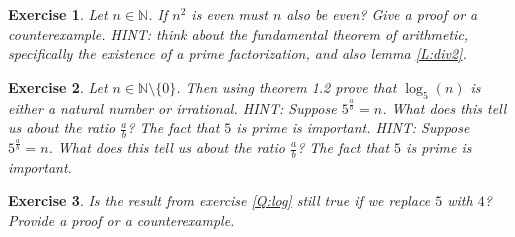 \documentclass{article}
\theoremstyle{plain}
\newtheorem{Q}{Exercise}{\bfseries}{\upshape}
\newcommand{\bN}{\mathbb{N}}
\begin{document}
\begin{Q}
Let $n\in\bN$. If $n^2$ is even must $n$ also be even? Give a proof or a counterexample. HINT: think about the fundamental theorem of arithmetic, specifically the existence of a prime factorization, and also lemma \ref{L:div2}.
\end{Q}
\begin{comment}
\textbf{Solution:} By the fundamental theorem of arithmetic, $n^2$ can be written in exactly one way as a product of primes (if we don't care about the order they're written down in), and the same is true for $n$. Suppose $n$ can be written as the product of primes $p_1\ldots p_k$. Then obviously $n^2$ can be written as  the product $p_1\ldots p_kp_1\ldots p_k$. If $n^2$ is even then $2| n^2$. Now, by lemma \ref{L:div2}, and the fact that $n^2 = p_1\ldots p_kp_1\ldots p_k$, we must have $2| p_i$ for some $i\in \{1,\ldots,k\}$, but this means $2|n$, and so $n$ is even too.
\end{comment}

\begin{Q}\label{\prefix Q:log}
Let $n\in\bN\setminus\{0\}$. Then using theorem 1.2 prove that $\log_5(n)$ is either a natural number or irrational. HINT: Suppose $5^{\frac{a}{b}}=n$. What does this tell us about the ratio $\frac{a}{b}$? The fact that $5$ is prime is important. HINT: Suppose $5^{\frac{a}{b}}=n$. What does this tell us about the ratio $\frac{a}{b}$? The fact that $5$ is prime is important.
\end{Q}
\begin{comment}
\textbf{Solution:} If $5^{\frac{a}{b}} = n$ then $5^a = n^b$. Using the fundamental theorem of arithmetic, $n^b$ can be uniquely factorized into primes. Since $n^b = 5^a$ we know this factorization must just be $55\ldots 5$ (a list of $a$ fives). Again by the fundamental theorem of arithmetic, $n$ must also have a unique factorization into primes, and, as $n^b = 55\ldots 5$, this factorization of $n$ must just be a list of fives (i.e. $n = 5^k$ for some $k$). But if we take a product of $b$ copies of this list of fives we get $n^b$, which is $5^a$ (i.e. $5^a = (5^k)^b$, so $a = kb$). This means that $b$ must divide $a$. In other words, $\frac{a}{b}$ must be a natural number.  
\end{comment}

\begin{Q}\label{\prefix Q:log2}
Is the result from exercise \ref{Q:log} still true if we replace $5$ with $4$? Provide a proof or a counterexample.
\end{Q}
\begin{comment}
\textbf{Solution:} It's not true. For example, $\log_4{2} = \frac{1}{2}$.
\end{comment}
\end{document}
